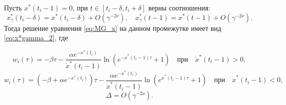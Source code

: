 \begin{lemma}
\label{lm:w}
	Пусть $x^*(t_i - 1) = 0$, при $t \in [t_i - \delta, t_i + \delta]$ верны соотношения:
	\[ x^*_{\gamma}(t_i - \delta) = x^*(t_i - \delta) + O(\gamma^{-2\nu}), \quad x^*_{\gamma}(t - 1) = x^*(t - 1) + O(\gamma^{-2\nu}).\]
	Тогда решение уравнения \eqref{eq:MG_x} на данном промежутке имеет вид \eqref{eq:x*gamma_2}, где
	
	\[
	w_i(\tau) = -\beta \tau - \dfrac{\alpha e^{-x^*(t_i)}}{\dot{x}^*(t_i - 1)} \ln\left(e^{-\dot{x}^*(t_i - 1)\tau} + 1\right) \quad \text{при} \quad \dot{x}^*(t_i - 1) > 0,
	\]
	\[
	w_i(\tau) = (-\beta + \alpha e^{-x^*(t_i)})\tau - \dfrac{\alpha e^{-x^*(t_i)}}{\dot{x}^*(t_i - 1)} \ln\left(e^{\dot{x}^*(t_i - 1)\tau} + 1\right) \quad \text{при} \quad \dot{x}^*(t_i - 1) < 0,
	\]
	\[
	\Delta = O(\gamma^{-2\nu}).
	\]
\end{lemma}
%
